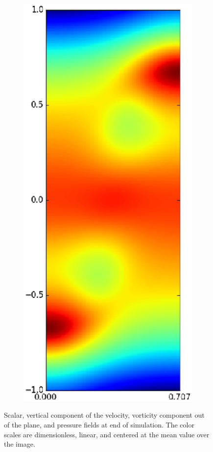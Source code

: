 \begin{figure}
\begin{subfigure}[b]{0.24\textwidth}
\end{subfigure}
\begin{subfigure}[b]{0.24\textwidth}
\includegraphics[width=\textwidth]{gfx/cnv_o16_e32-p_yz-0033}
\end{subfigure}
\caption{ 
Scalar, vertical component of the velocity, vorticity component out of the plane, and pressure fields at end of simulation.
The color scales are dimensionless, linear, and centered at the mean value over the image.
}
\end{figure}

